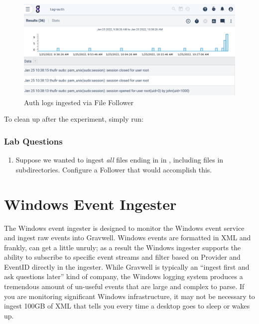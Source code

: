 \begin{figure}
	\includegraphics{images/igst-filefollow-lab.png}
	\caption{Auth logs ingested via File Follower}
	\label{fig:file-follow-lab}
\end{figure}

To clean up after the experiment, simply run:


\subsubsection{Lab Questions}

\begin{enumerate}
\item
  Suppose we wanted to ingest \emph{all} files ending in  in
  , including files in subdirectories. Configure a Follower that
  would accomplish this.
\end{enumerate}

\clearpage

\section{Windows Event Ingester}
The Windows event ingester is designed to monitor the Windows event
service and ingest raw events into Gravwell. Windows events are
formatted in XML and frankly, can get a little unruly; as a result the
Windows ingester supports the ability to subscribe to specific event
streams and filter based on Provider and EventID directly in the
ingester. While Gravwell is typically an ``ingest first and ask
questions later'' kind of company, the Windows logging system produces a
tremendous amount of un-useful events that are large and complex to
parse. If you are monitoring significant Windows infrastructure, it may
not be necessary to ingest 100GB of XML that tells you every time a
desktop goes to sleep or wakes up.

